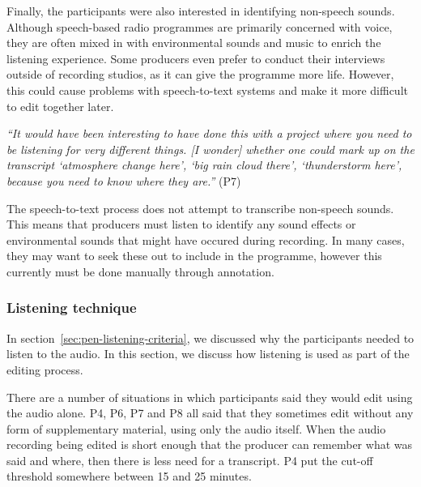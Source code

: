

Finally, the participants were also interested in identifying non-speech sounds. Although speech-based radio programmes
are primarily concerned with voice, they are often mixed in with environmental sounds and music to enrich the listening
experience. Some producers even prefer to conduct their interviews outside of recording studios, as it can give the
programme more life. However, this could cause problems with speech-to-text systems and make it more difficult to edit
together later.


\textit{``It would have been interesting to have done this with a project where you need to be listening for very
different things. [I wonder] whether one could mark up on the transcript `atmosphere change here', `big rain cloud
there', `thunderstorm here', because you need to know where they are.''} (P7)

The speech-to-text process does not attempt to transcribe non-speech sounds. This means that producers must listen to
identify any sound effects or environmental sounds that might have occured during recording. In many cases, they may
want to seek these out to include in the programme, however this currently must be done manually through annotation.

\subsubsection{Listening technique}

In section~\ref{sec:pen-listening-criteria}, we discussed why the participants needed to listen to the audio. In this
section, we discuss how listening is used as part of the editing process.


There are a number of situations in which participants said they would edit using the audio alone. P4, P6, P7 and P8
all said that they sometimes edit without any form of supplementary material, using only the audio itself. When
the audio recording being edited is short enough that the producer can remember what was said and where, then
there is less need for a transcript. P4 put the cut-off threshold somewhere between 15 and 25 minutes.

